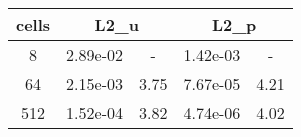 \documentclass[10pt]{report}
\begin{document}
\begin{table}[H]
\begin{center}
\begin{tabular}{|c|c|c|c|c|} \hline
cells & 
\multicolumn{2}{|c|}{L2_u} & 
\multicolumn{2}{|c|}{L2_p}\\ \hline
8 & 2.89e-02 & - & 1.42e-03 & -\\ \hline
64 & 2.15e-03 & 3.75 & 7.67e-05 & 4.21\\ \hline
512 & 1.52e-04 & 3.82 & 4.74e-06 & 4.02\\ \hline
\end{tabular}
\end{center}
\end{table}
\end{document}
